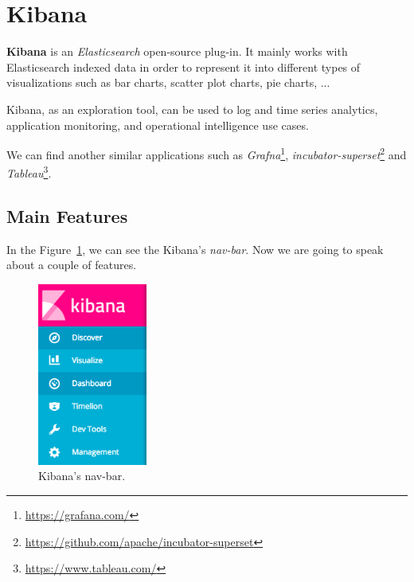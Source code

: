 \documentclass[a4paper, 12pt, english]{book}
\begin{document}
\section{Kibana}
\label{sec:kibana}

\textbf{Kibana} is an \textit{Elasticsearch} open-source plug-in. It mainly works with Elasticsearch indexed data in order to represent it into different types of visualizations such as bar charts, scatter plot charts, pie charts, ...

Kibana, as an exploration tool, can be used to log and time series analytics, application monitoring, and operational intelligence use cases.

We can find another similar applications such as \textit{Grafna}\footnote{\url{https://grafana.com/}}, \textit{incubator-superset}\footnote{\url{https://github.com/apache/incubator-superset}} and \textit{Tableau}\footnote{\url{https://www.tableau.com/}}.

\subsection{Main Features}
\label{sec:kibana-functoinalities}

In the Figure~\ref{fig:kibana-nav-bar}, we can see the Kibana's \textit{nav-bar}. Now we are going to speak about a couple of features.
\begin{figure}
  \centering
  \includegraphics[height=6cm, keepaspectratio]{img/kibana-nav-bar}
  \caption{Kibana's nav-bar.}
  \label{fig:kibana-nav-bar}
\end{figure}
\end{document}

